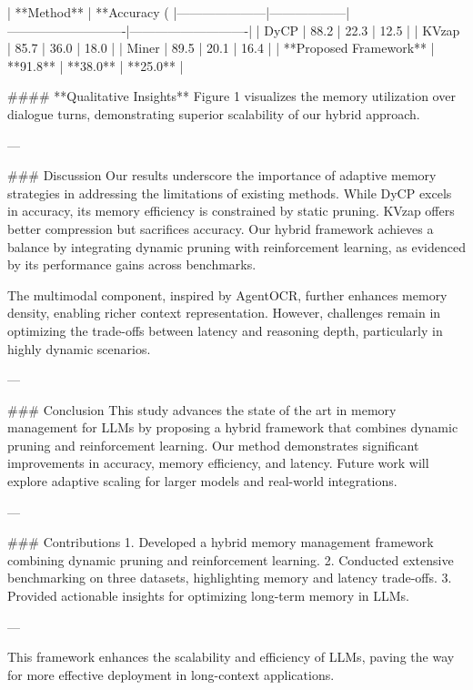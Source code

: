 | **Method**         | **Accuracy (%
|---------------------|------------------|----------------------------|----------------------------|  
| DyCP               | 88.2            | 22.3                      | 12.5                      |  
| KVzap              | 85.7            | 36.0                      | 18.0                      |  
| Miner              | 89.5            | 20.1                      | 16.4                      |  
| **Proposed Framework** | **91.8**        | **38.0**                  | **25.0**                  |  

#### **Qualitative Insights**  
Figure 1 visualizes the memory utilization over dialogue turns, demonstrating superior scalability of our hybrid approach.

---

### Discussion  
Our results underscore the importance of adaptive memory strategies in addressing the limitations of existing methods. While DyCP excels in accuracy, its memory efficiency is constrained by static pruning. KVzap offers better compression but sacrifices accuracy. Our hybrid framework achieves a balance by integrating dynamic pruning with reinforcement learning, as evidenced by its performance gains across benchmarks.

The multimodal component, inspired by AgentOCR, further enhances memory density, enabling richer context representation. However, challenges remain in optimizing the trade-offs between latency and reasoning depth, particularly in highly dynamic scenarios.

---

### Conclusion  
This study advances the state of the art in memory management for LLMs by proposing a hybrid framework that combines dynamic pruning and reinforcement learning. Our method demonstrates significant improvements in accuracy, memory efficiency, and latency. Future work will explore adaptive scaling for larger models and real-world integrations.

---

### Contributions  
1. Developed a hybrid memory management framework combining dynamic pruning and reinforcement learning.  
2. Conducted extensive benchmarking on three datasets, highlighting memory and latency trade-offs.  
3. Provided actionable insights for optimizing long-term memory in LLMs.

--- 

This framework enhances the scalability and efficiency of LLMs, paving the way for more effective deployment in long-context applications.